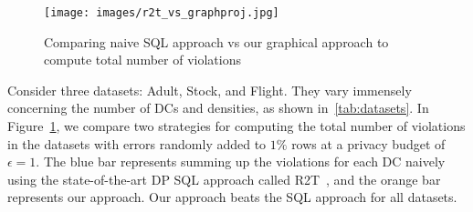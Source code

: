 \begin{example}
    \begin{figure}
        \centering
        \texttt{[image: images/r2t\_vs\_graphproj.jpg]}
        \caption{Comparing naive SQL approach vs our graphical approach to compute total number of violations }
        \label{fig:r2tvsgraph}
    \end{figure}
     
    Consider three datasets: Adult, Stock, and Flight. They vary immensely concerning the number of DCs and densities, as shown in~\cref{tab:datasets}. In Figure~\ref{fig:r2tvsgraph}, we compare two strategies for computing the total number of violations in the datasets with errors randomly added to $1\%$ rows at a privacy budget of $\epsilon=1$. The blue bar represents summing up the violations for each DC naively using the state-of-the-art DP SQL approach called R2T~\cite{dong2022r2t}, and the orange bar represents our approach. Our approach beats the SQL approach for all datasets. 
\end{example}

